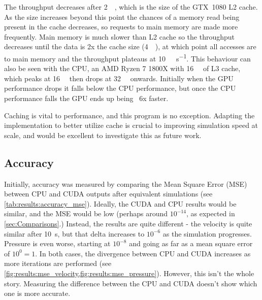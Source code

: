 The throughput decreases after \SI{2}{\mega\byte}, which is the size of the GTX~1080 L2 cache\cite{nvidia1080Whitepaper}.
As the size increases beyond this point the chances of a memory read being present in the cache decreases, so requests to main memory are made more frequently.
Main memory is much slower than L2 cache so the throughput decreases until the data is 2x the cache size (\SI{4}{\mega\byte}), at which point all accesses are to main memory and the throughput plateaus at \SI{10}{\giga\op\per\second}.
This behaviour can also be seen with the CPU, an AMD Ryzen 7 1800X with \SI{16}{\mega\byte} of L3 cache, which peaks at \SI{16}{\mega\byte} then drops at \SI{32}{\mega\byte} onwards.
Initially when the GPU performance drops it falls below the CPU performance, but once the CPU performance falls the GPU ends up being ~6x faster.

Caching is vital to performance, and this program is no exception.
Adapting the implementation to better utilize cache is crucial to improving simulation speed at scale, and would be excellent to investigate this as future work.

\subsection{Accuracy}\label{sec:Results:Sim:Accuracy}

Initially, accuracy was measured by comparing the Mean Square Error (MSE) between CPU and CUDA outputs after equivalent simulations (see \cref{tab:results:accuracy_mse}).
Ideally, the CUDA and CPU results would be similar, and the MSE would be low (perhaps around $10^{-14}$, as expected in \cref{sec:Comparisons}.)
Instead, the results are quite different - the velocity is quite similar after \SI{10}{\second}, but that delta increases to $10^{-6}$ as the simulation progresses.
Pressure is even worse, starting at $10^{-8}$ and going as far as a mean square error of $10^{0} = 1$.
In both cases, the divergence between CPU and CUDA increases as more iterations are performed (see \cref{fig:results:mse_velocity,fig:results:mse_pressure}).
However, this isn't the whole story.
Measuring the difference between the CPU and CUDA doesn't show which one is more accurate.

